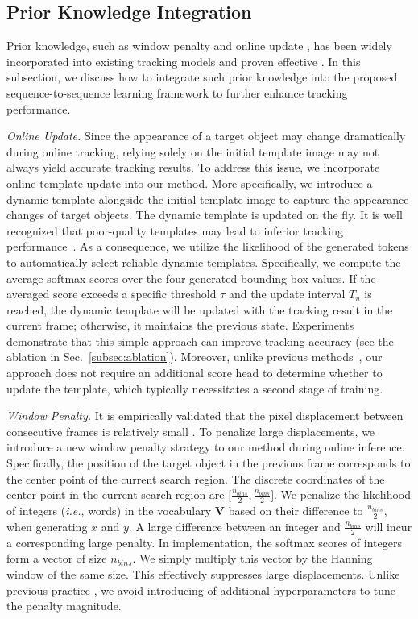 \subsection{Prior Knowledge Integration}
\label{subsec:prior}

Prior knowledge, such as window penalty \cite{SiameseFC,SiameseRPN} and online update \cite{ATOM,Stark,li2013survey}, has been widely incorporated into existing tracking models and proven effective \cite{transt,ostrack,mixformer,VITAL}. In this subsection, we discuss how to integrate such prior knowledge into the proposed sequence-to-sequence learning framework to further enhance tracking performance.

\textit{Online Update.}
Since the appearance of a target object may change dramatically during online tracking, relying solely on the initial template image may not always yield accurate tracking results.
To address this issue, we incorporate online template update \cite{Stark} into our method. More specifically, we introduce a dynamic template alongside the initial template image to capture the appearance changes of target objects. 
The dynamic template is updated on the fly. It is well recognized that poor-quality templates may lead to inferior tracking performance~\cite{mixformer}.
As a consequence, we utilize the likelihood of the generated tokens to automatically select reliable dynamic templates. 
Specifically, we compute the average softmax scores over the four generated bounding box values. If the averaged score exceeds a specific threshold $\tau$ and the update interval $T_u$ is reached, the dynamic template will be updated with the tracking result in the current frame; otherwise, it maintains the previous state. Experiments demonstrate that this simple approach can improve tracking accuracy (see the ablation in Sec.~\ref{subsec:ablation}). 
Moreover, unlike previous methods~\cite{Stark,mixformer}, our approach does not require an additional score head to determine whether to update the template, which typically necessitates a second stage of training.

\textit{Window Penalty.}
It is empirically validated that the pixel displacement between consecutive frames is relatively small \cite{SiameseFC,SiameseRPN}.
To penalize large displacements, we introduce a new window penalty strategy to our method during online inference.
Specifically, the position of the target object in the previous frame corresponds to the center point of the current search region.
The discrete coordinates of the center point in the current search region are $[\frac{n_{bins}}{2},$$\frac{n_{bins}}{2}]$.
We penalize the likelihood of integers (\emph{i.e.}, words) in the vocabulary $\bm{V}$ based on their difference to $\frac{n_{bins}}{2}$, when generating $x$ and $y$.
A large difference between an integer and $\frac{n_{bins}}{2}$ will incur a corresponding large penalty.
In implementation, the softmax scores of integers form a vector of size $n_{bins}$.
We simply multiply this vector by the Hanning window of the same size.
This effectively suppresses large displacements.
Unlike previous practice \cite{SiameseRPN,transt}, we avoid introducing of additional hyperparameters to tune the penalty magnitude.

